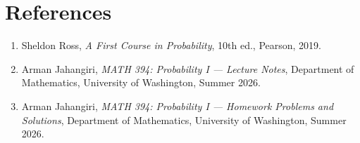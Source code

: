 \documentclass[11pt]{article}
\begin{document}
\newpage
\section*{References}

\begin{enumerate}

    \item Sheldon Ross,
    \textit{A First Course in Probability},
    10th ed.,
    Pearson, 2019.

    \item Arman Jahangiri,
    \textit{MATH 394: Probability I --- Lecture Notes},
    Department of Mathematics,
    University of Washington,
    Summer 2026.

    \item Arman Jahangiri,
    \textit{MATH 394: Probability I --- Homework Problems and Solutions},
    Department of Mathematics,
    University of Washington,
    Summer 2026.

\end{enumerate}
\end{document}
